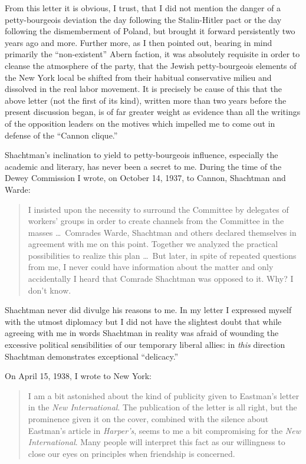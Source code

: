 From this letter it is obvious, I trust, that I did not mention the danger of a petty-bourgeois deviation the day following the Stalin-Hitler pact or the day following the dismemberment of Poland, but brought it forward persistently two years ago and more. Further more, as I then pointed out, bearing in mind primarily the “non-existent” Abern faction, it was absolutely requisite in order to cleanse the atmosphere of the party, that the Jewish petty-bourgeois elements of the New York local be shifted from their habitual conservative milieu and dissolved in the real labor movement. It is precisely be cause of this that the above letter (not the first of its kind), written more than two years before the present discussion began, is of far greater weight as evidence than all the writings of the opposition leaders on the motives which impelled me to come out in defense of the “Cannon clique.”


\noindent
Shachtman’s inclination to yield to petty-bourgeois influence, especially the academic and literary, has never been a secret to me. During the time of the Dewey Commission I wrote, on October 14, 1937, to Cannon, Shachtman and Warde:

\begin{quote}
  I insisted upon the necessity to surround the Committee by delegates of workers’ groups in order to create channels from the Committee in the masses \dots\ Comrades Warde, Shachtman and others declared themselves in agreement with me on this point. Together we analyzed the practical possibilities to realize this plan \dots\ But later, in spite of repeated questions from me, I never could have information about the matter and only accidentally I heard that Comrade Shachtman was opposed to it. Why? I don’t know.
\end{quote}

Shachtman never did divulge his reasons to me. In my letter I expressed myself with the utmost diplomacy but I did not have the slightest doubt that while agreeing with me in words Shachtman in reality was afraid of wounding the excessive political sensibilities of our temporary liberal allies: in \emph{this} direction Shachtman demonstrates exceptional “delicacy.”


\noindent
On April 15, 1938, I wrote to New York:

\begin{quote}
  I am a bit astonished about the kind of publicity given to Eastman’s letter in the \emph{New International}. The publication of the letter is all right, but the prominence given it on the cover, combined with the silence about Eastman’s article in \emph{Harper’s}, seems to me a bit compromising for the \emph{New International}. Many people will interpret this fact as our willingness to close our eyes on principles when friendship is concerned.
\end{quote}

